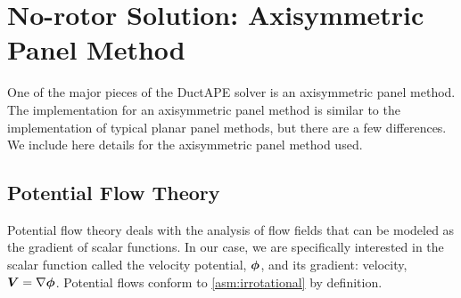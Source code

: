 



\section{No-rotor Solution: Axisymmetric Panel Method}
\label{sec:axisymmetricpanelmethod}

One of the major pieces of the DuctAPE solver is an axisymmetric panel method.
The implementation for an axisymmetric panel method is similar to the implementation of typical planar panel methods, but there are a few differences.
We include here details for the axisymmetric panel method used.

\subsection{Potential Flow Theory}
\label{ssec:potentialflow}

Potential flow theory deals with the analysis of flow fields that can be modeled as the gradient of scalar functions.
%
In our case, we are specifically interested in the scalar function called the velocity potential, \(\bm{\phi}\), and its gradient: velocity, \(\bm{V}=\nabla\bm{\phi}\).
%
Potential flows conform to \cref{asm:irrotational} by definition.

\begin{assumption}{}
    \label{asm:irrotational}




\end{assumption}

